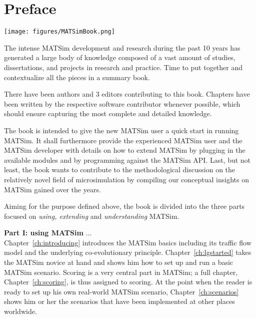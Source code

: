 \chapter*{Preface}

\begin{center} \texttt{[image: figures/MATSimBook.png]} \end{center}

The intense MATSim development and research during the past 10 years has generated a large body of knowledge composed of a vast amount of studies, dissertations, and projects in research and practice. Time to put together and contextualize all the pieces in a summary book.

There have been  authors and 3 editors contributing to this book. Chapters have been written by the respective software contributor whenever possible, which should ensure capturing the most complete and detailed knowledge. 

The book is intended to give the new MATSim user a quick start in running MATSim. It shall furthermore provide the experienced MATSim user and the MATSim developer with details on how to extend MATSim by plugging in the available modules and by programming against the MATSim API. Last, but not least, the book wants to contribute to the methodological discussion on the relatively novel field of microsimulation by compiling our conceptual insights on MATSim gained over the years.

Aiming for the purpose defined above, the book is divided into the three parts focused on \emph{using, extending} and \emph{understanding} MATSim.

\textbf{Part I: using MATSim} ... \\
Chapter~\ref{ch:introducing} introduces the MATSim basics including its traffic flow model and the underlying co-evolutionary principle. Chapter~\ref{ch:lgstarted} takes the MATSim novice at hand and shows him how to set up and run a basic MATSim scenario. Scoring is a very central part in MATSim; a full chapter, Chapter~\ref{ch:scoring}, is thus assigned to scoring. At the point when the reader is ready to set up his own real-world MATSim scenario, Chapter~\ref{ch:scenarios} shows him or her the scenarios that have been implemented at other places worldwide. 

